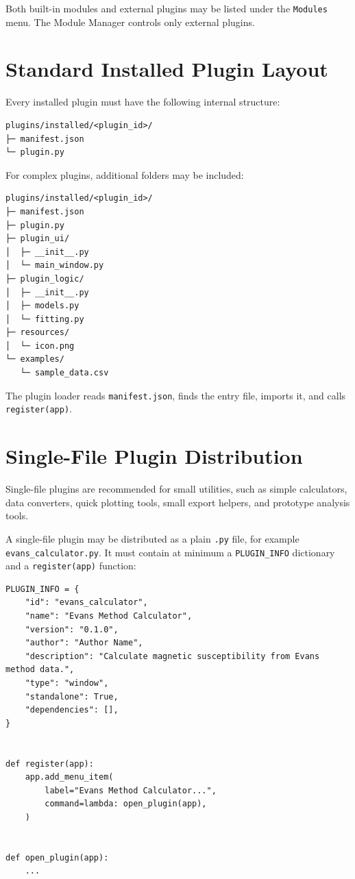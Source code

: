 \documentclass[11pt, a4paper]{article}
\begin{document}
\vspace{4pt}
Both built-in modules and external plugins may be listed under the \texttt{Modules} menu. The Module Manager controls only external plugins.

\section{Standard Installed Plugin Layout}

Every installed plugin must have the following internal structure:

\begin{lstlisting}[style=text]
plugins/installed/<plugin_id>/
├─ manifest.json
└─ plugin.py
\end{lstlisting}

For complex plugins, additional folders may be included:

\begin{lstlisting}[style=text]
plugins/installed/<plugin_id>/
├─ manifest.json
├─ plugin.py
├─ plugin_ui/
│  ├─ __init__.py
│  └─ main_window.py
├─ plugin_logic/
│  ├─ __init__.py
│  ├─ models.py
│  └─ fitting.py
├─ resources/
│  └─ icon.png
└─ examples/
   └─ sample_data.csv
\end{lstlisting}

The plugin loader reads \texttt{manifest.json}, finds the entry file, imports it, and calls \texttt{register(app)}.

\section{Single-File Plugin Distribution}

Single-file plugins are recommended for small utilities, such as simple calculators, data converters, quick plotting tools, small export helpers, and prototype analysis tools.

A single-file plugin may be distributed as a plain \texttt{.py} file, for example \texttt{evans\_calculator.py}. It must contain at minimum a \texttt{PLUGIN\_INFO} dictionary and a \texttt{register(app)} function:

\begin{lstlisting}[style=python]
PLUGIN_INFO = {
    "id": "evans_calculator",
    "name": "Evans Method Calculator",
    "version": "0.1.0",
    "author": "Author Name",
    "description": "Calculate magnetic susceptibility from Evans method data.",
    "type": "window",
    "standalone": True,
    "dependencies": [],
}


def register(app):
    app.add_menu_item(
        label="Evans Method Calculator...",
        command=lambda: open_plugin(app),
    )


def open_plugin(app):
    ...
\end{lstlisting}
\end{document}
